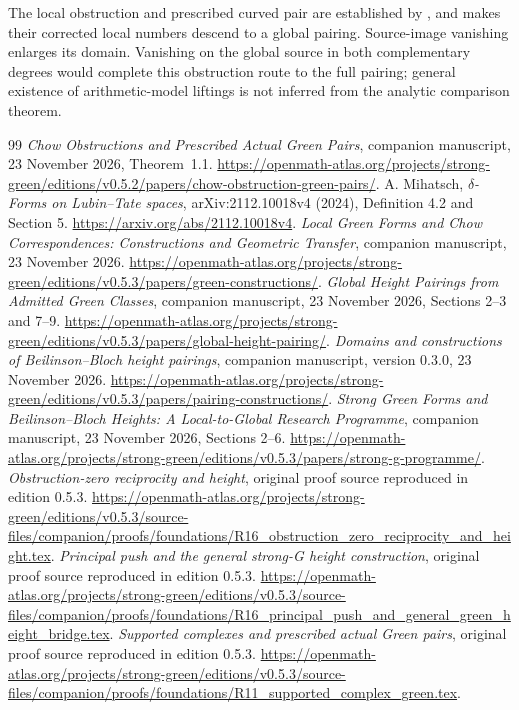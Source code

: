 \documentclass[11pt,a4paper]{article}
\theoremstyle{definition}
\numberwithin{equation}{section}
\begin{document}
The local obstruction and prescribed curved pair are established by , and  makes their corrected local numbers descend to a global pairing. Source-image vanishing enlarges its domain. Vanishing on the global source in both complementary degrees would complete this obstruction route to the full pairing; general existence of arithmetic-model liftings is not inferred from the analytic comparison theorem.

\begin{thebibliography}{99}
 \emph{Chow Obstructions and Prescribed Actual Green Pairs}, companion manuscript, 23 November 2026, Theorem~1.1. \url{https://openmath-atlas.org/projects/strong-green/editions/v0.5.2/papers/chow-obstruction-green-pairs/}.
 A. Mihatsch, \emph{$\delta$-Forms on Lubin--Tate spaces}, arXiv:2112.10018v4 (2024), Definition 4.2 and Section 5. \url{https://arxiv.org/abs/2112.10018v4}.
 \emph{Local Green Forms and Chow Correspondences: Constructions and Geometric Transfer}, companion manuscript, 23 November 2026. \url{https://openmath-atlas.org/projects/strong-green/editions/v0.5.3/papers/green-constructions/}.
 \emph{Global Height Pairings from Admitted Green Classes}, companion manuscript, 23 November 2026, Sections 2--3 and 7--9. \url{https://openmath-atlas.org/projects/strong-green/editions/v0.5.3/papers/global-height-pairing/}.
 \emph{Domains and constructions of Beilinson--Bloch height pairings}, companion manuscript, version 0.3.0, 23 November 2026. \url{https://openmath-atlas.org/projects/strong-green/editions/v0.5.3/papers/pairing-constructions/}.
 \emph{Strong Green Forms and Beilinson--Bloch Heights: A Local-to-Global Research Programme}, companion manuscript, 23 November 2026, Sections 2--6. \url{https://openmath-atlas.org/projects/strong-green/editions/v0.5.3/papers/strong-g-programme/}.
 \emph{Obstruction-zero reciprocity and height}, original proof source reproduced in edition 0.5.3. \url{https://openmath-atlas.org/projects/strong-green/editions/v0.5.3/source-files/companion/proofs/foundations/R16_obstruction_zero_reciprocity_and_height.tex}.
 \emph{Principal push and the general strong-G height construction}, original proof source reproduced in edition 0.5.3. \url{https://openmath-atlas.org/projects/strong-green/editions/v0.5.3/source-files/companion/proofs/foundations/R16_principal_push_and_general_green_height_bridge.tex}.
 \emph{Supported complexes and prescribed actual Green pairs}, original proof source reproduced in edition 0.5.3. \url{https://openmath-atlas.org/projects/strong-green/editions/v0.5.3/source-files/companion/proofs/foundations/R11_supported_complex_green.tex}.

\end{thebibliography}
\end{document}
